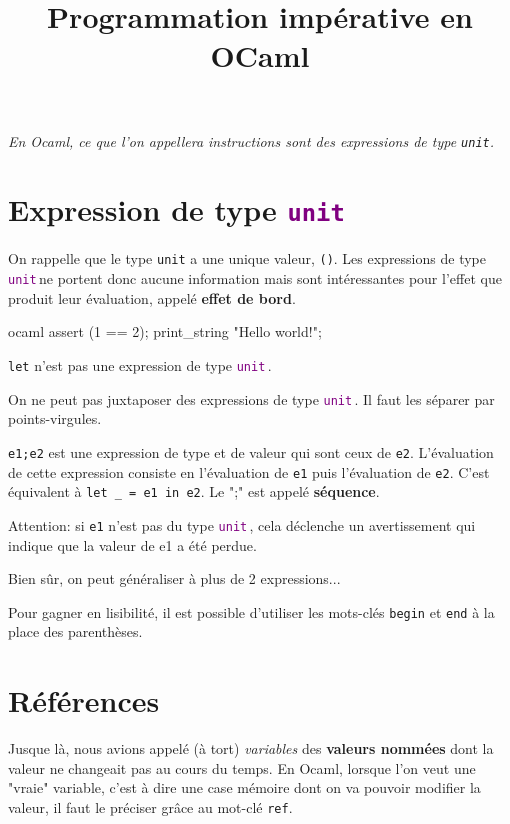 \documentclass{scrartcl}
\title{Programmation impérative en OCaml}
\author{}
\date{}
\newcommand{\ocaml}[1]{\texttt{#1}}
\newcommand{\unit}{\textcolor{purple}{\texttt{unit}}\,}
\begin{document}
	\maketitle
	\begin{center}\textsl{En Ocaml, ce que l'on appellera instructions sont des expressions de type \texttt{unit}.}\end{center}
	\section{Expression de type \unit}
		On rappelle que le type \texttt{unit} a une unique valeur, \texttt{()}. 
		Les expressions de type \unit ne portent donc aucune information mais sont intéressantes pour l'effet que produit leur évaluation,
		appelé \textbf{effet de bord}.

		\exemple
		\begin{code}{ocaml} 
			assert (1 == 2);
			print_string "Hello world!";
		\end{code}

		\rem \texttt{let} n'est pas une expression de type \unit.

		\rem On ne peut pas juxtaposer des expressions de type \unit. Il faut les séparer par points-virgules.

		\exemple \texttt{e1;e2} est une expression de type et de valeur qui sont ceux de \texttt{e2}.
		L'évaluation de cette expression consiste en l'évaluation de \texttt{e1} puis l'évaluation de \texttt{e2}. 
		C'est équivalent à \ocaml{let _ = e1 in e2}. Le ";" est appelé \textbf{séquence}.

		\rem Attention: si \texttt{e1} n'est pas du type \unit, cela déclenche un avertissement qui indique que la valeur de e1 a été perdue.
	
		\rem Bien sûr, on peut généraliser à plus de 2 expressions...

		Pour gagner en lisibilité, il est possible d'utiliser les mots-clés \ocaml{begin} et \ocaml{end} à la place
		des parenthèses.

	\section{Références}
		Jusque là, nous avions appelé (à tort) \textsl{variables} des \textbf{valeurs nommées} dont la valeur ne changeait pas au cours du temps.
		En Ocaml, lorsque l'on veut une "vraie" variable, c'est à dire une case mémoire dont on va pouvoir modifier la valeur, il faut le préciser
		grâce au mot-clé \ocaml{ref}.	
		
\end{document}
